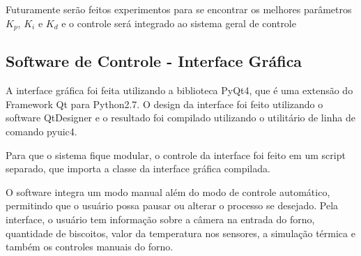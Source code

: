 Futuramente serão feitos experimentos para se encontrar os melhores parâmetros $K_p$, $K_i$ e $K_d$ e o controle será integrado ao sistema geral de controle

\subsection{Software de Controle - Interface Gráfica}
 
A interface gráfica foi feita utilizando a biblioteca PyQt4, que é uma extensão do Framework Qt para Python2.7. O design da interface foi feito utilizando o software QtDesigner e o resultado foi compilado utilizando o utilitário de linha de comando pyuic4.

Para que o sistema fique modular, o controle da interface foi feito em um script separado, que importa a classe da interface gráfica compilada. 

O software integra um modo manual além do modo de controle automático, permitindo que o usuário possa pausar ou alterar o processo se desejado. Pela interface, o usuário tem informação sobre a câmera na entrada do forno, quantidade de biscoitos, valor da temperatura nos sensores, a simulação térmica e também os controles manuais do forno.




